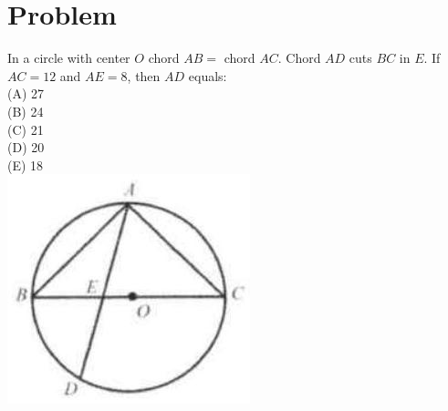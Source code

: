 \documentclass{article}
\begin{document}
\section*{Problem}
In a circle with center \(O\) chord \(A B=\) chord \(A C\). Chord \(A D\) cuts \(B C\) in \(E\). If \(A C=12\) and \(A E=8\), then \(A D\) equals:\\
(A) 27\\
(B) 24\\
(C) 21\\
(D) 20\\
(E) 18\\
\centering
\includegraphics[width=\textwidth]{images/170.jpg}
\end{document}
